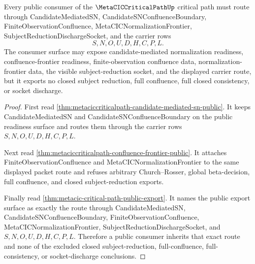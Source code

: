 \begin{theorem}
\label{thm:metacic-critical-path-public-consumer-surface}
Every public consumer of the $\MetaCICCriticalPathUp$ critical path must route through CandidateMediatedSN, CandidateSNConfluenceBoundary, FiniteObservationConfluence, MetaCICNormalizationFrontier, SubjectReductionDischargeSocket, and the carrier rows
$$
S,N,O,U,D,H,C,P,L.
$$
The consumer surface may expose candidate-mediated normalization readiness, confluence-frontier readiness, finite-observation confluence data, normalization-frontier data, the visible subject-reduction socket, and the displayed carrier route, but it exports no closed subject reduction, full confluence, full closed consistency, or socket discharge.
\end{theorem}
\begin{proof}
First read \autoref{thm:metaciccriticalpath-candidate-mediated-sn-public}. It keeps CandidateMediatedSN and CandidateSNConfluenceBoundary on the public readiness surface and routes them through the carrier rows $S,N,O,U,D,H,C,P,L$.

Next read \autoref{thm:metaciccriticalpath-confluence-frontier-public}. It attaches FiniteObservationConfluence and MetaCICNormalizationFrontier to the same displayed packet route and refuses arbitrary Church--Rosser, global beta-decision, full confluence, and closed subject-reduction exports.

Finally read \autoref{thm:metacic-critical-path-public-export}. It names the public export surface as exactly the route through CandidateMediatedSN, CandidateSNConfluenceBoundary, FiniteObservationConfluence, MetaCICNormalizationFrontier, SubjectReductionDischargeSocket, and $S,N,O,U,D,H,C,P,L$. Therefore a public consumer inherits that exact route and none of the excluded closed subject-reduction, full-confluence, full-consistency, or socket-discharge conclusions.
\end{proof}

